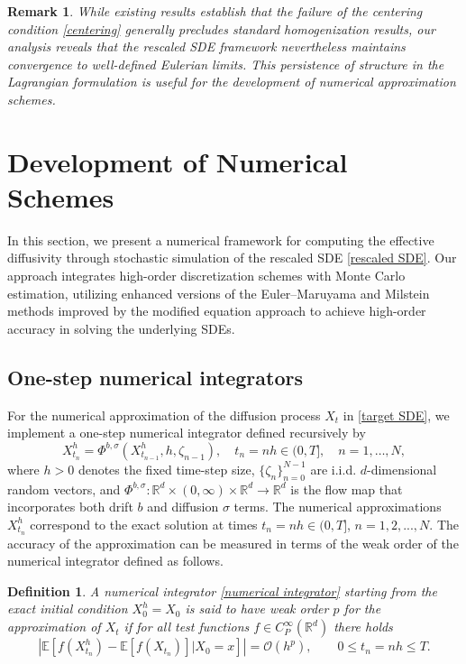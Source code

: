 \documentclass[12pt,a4paper,reqno]{amsart}
\newtheorem{definition}{Definition}[section]
\newtheorem{remark}{Remark}[section]
\numberwithin{equation}{section}
\begin{document}
\begin{remark} 
    While existing results  \cite{HO11,JZ23,PS05,JKO94} establish that the failure of the centering condition \eqref{centering} generally precludes standard homogenization results, our analysis reveals that the rescaled SDE framework nevertheless maintains convergence to well-defined Eulerian limits. This persistence of structure in the Lagrangian formulation is useful for the development of numerical approximation schemes.
\end{remark}


\section{Development of Numerical Schemes}

In this section, we present a numerical framework for computing the effective diffusivity through stochastic simulation of the rescaled SDE \eqref{rescaled SDE}. Our approach integrates high-order discretization schemes with Monte Carlo estimation, utilizing enhanced versions of the Euler--Maruyama and Milstein methods \cite{MT21} improved by the modified equation approach \cite{ACV12} to achieve high-order accuracy in solving the underlying SDEs. 

\subsection{One-step numerical integrators}

For the numerical approximation of the diffusion process $X_t$ in \eqref{target SDE}, we implement a one-step numerical integrator defined recursively by
\begin{equation}\label{numerical integrator}
	X^h_{t_{n}} = \Phi^{b,\sigma}(X^h_{t_{n-1}}, h, \zeta_{n-1}), \quad t_n = nh \in (0,T], \quad n=1,\dots,N,
\end{equation}
where $h > 0$ denotes the fixed time-step size, $\{\zeta_n\}_{n=0}^{N-1}$ are i.i.d. $d$-dimensional random vectors, and $\Phi^{b,\sigma}: \mathbb{R}^d \times (0,\infty) \times \mathbb{R}^d \to \mathbb{R}^d$ is the flow map that incorporates both drift $b$ and diffusion $\sigma$ terms. The numerical approximations $X^h_{t_n}$ correspond to the exact solution at times $t_n  = nh\in (0,T]$, $n= 1,2,...,N$. The accuracy of the approximation can be measured in terms of the weak order of the numerical integrator defined as follows.

\begin{definition}\cite{MT21}
    A numerical integrator \eqref{numerical integrator} starting from the exact initial condition $X_0^h = X_0$ is said to have weak order $p$ for the approximation of $X_{t}$ if for all test functions $f \in C_P^{\infty}(\mathbb{R}^d)$ there holds
    \begin{equation*}
        \left|\mathbb{E}\left[f\left(X_{t_n}^h\right) - \mathbb{E}[f(X_{t_n})]|X_0 = x\right]\right| = \mathcal{O}( h^p),\qquad 0\leq t_n = nh\leq T.
    \end{equation*}    
\end{definition}
\end{document}

